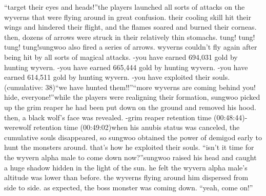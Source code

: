 “target their eyes and heads!”the players launched all sorts of attacks on the wyverns that were flying around in great confusion.
 their cooling skill hit their wings and hindered their flight, and the flames soared and burned their corneas.
 then, dozens of arrows were struck in their relatively thin stomachs.
tung! tung! tung! tung!sungwoo also fired a series of arrows.
 wyverns couldn’t fly again after being hit by all sorts of magical attacks.
-you have earned 694,031 gold by hunting wyvern.
-you have earned 665,444 gold by hunting wyvern.
-you have earned 614,511 gold by hunting wyvern.
-you have exploited their souls.
 (cumulative: 38)“we have hunted them!!”“more wyverns are coming behind you! hide, everyone!”while the players were realigning their formation, sungwoo picked up the grim reaper he had been put down on the ground and removed his hood.
 then, a black wolf’s face was revealed.
-grim reaper retention time (00:48:44)-werewolf retention time (00:49:02)when his anubis status was canceled, the cumulative souls disappeared, so sungwoo obtained the power of demigod early to hunt the monsters around.
 that’s how he exploited their souls.
“isn’t it time for the wyvern alpha male to come down now?”sungwoo raised his head and caught a huge shadow hidden in the light of the sun.
he felt the wyvern alpha male’s altitude was lower than before.
 the wyverns flying around him dispersed from side to side.
as expected, the boss monster was coming down.
“yeah, come on!”

 